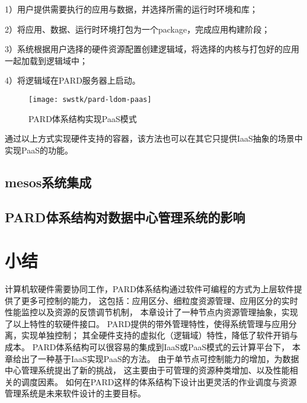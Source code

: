 1）用户提供需要执行的应用与数据，并选择所需的运行时环境和库；

2）将应用、数据、运行时环境打包为一个package，完成应用构建阶段；

3）系统根据用户选择的硬件资源配置创建逻辑域，将选择的内核与打包好的应用一起加载到逻辑域中；

4）将逻辑域在PARD服务器上启动。

\begin{figure}[tb]
  \centering
  \texttt{[image: swstk/pard-ldom-paas]}
  \caption{PARD体系结构实现PaaS模式}
  \label{fig:pard-ldom-paas}
\end{figure}

通过以上方式实现硬件支持的容器，该方法也可以在其它只提供IaaS抽象的场景中实现PaaS的功能。

\subsection{mesos系统集成}



\subsection{PARD体系结构对数据中心管理系统的影响}


\section{小结}

计算机软硬件需要协同工作，PARD体系结构通过软件可编程的方式为上层软件提供了更多可控制的能力，
这包括：应用区分、细粒度资源管理、应用区分的实时性能监控以及资源的反馈调节机制，
本章设计了一种节点内资源管理抽象，实现了以上特性的软硬件接口。
PARD提供的带外管理特性，使得系统管理与应用分离，实现单独控制；
其全硬件支持的虚拟化（逻辑域）特性，降低了软件开销与成本。
PARD体系结构可以很容易的集成到IaaS或PaaS模式的云计算平台下，
本章给出了一种基于IaaS实现PaaS的方法。
由于单节点可控制能力的增加，为数据中心管理系统提出了新的挑战，
这主要由于可管理的资源种类增加、以及性能相关的调度因素。
如何在PARD这样的体系结构下设计出更灵活的作业调度与资源管理系统是未来软件设计的主要目标。

